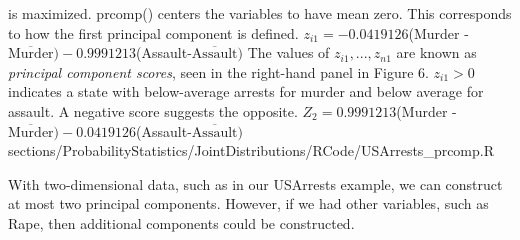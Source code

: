 {{is maximized. 
\newline
\newline
{\color{blue}prcomp()} centers the variables to have mean zero. This corresponds to how the first principal component is defined.
\newline
\newline
$z_{i1}=-0.0419126$(Murder - $\overline{\mbox{Murder}})-0.9991213$(Assault-$\overline{\mbox{Assault}})$
\newline
\newline
The values of $z_{i1},...,z_{n1}$ are known as \textit{principal component scores}, seen in the right-hand panel in Figure 6. $z_{i1} > 0$ indicates a state with below-average arrests for murder and below average for assault. A negative score suggests the opposite.
\newline
\newline
	$Z_2=0.9991213$(Murder - $\overline{\mbox{Murder}})-0.0419126$(Assault-$\overline{\mbox{Assault}})$
 }
	{sections/ProbabilityStatistics/JointDistributions/RCode/USArrests_prcomp.R}

	With two-dimensional data, such as in our USArrests example, we can construct at most two principal components. However, if we had other variables, such as Rape, then additional components could be constructed.
	
}
